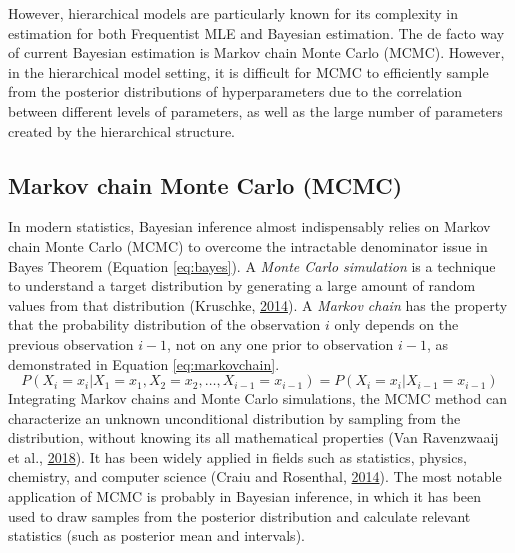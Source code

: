 \documentclass[12pt]{book}
\numberwithin{equation}{chapter}
\begin{document}
However, hierarchical models are particularly known for its complexity in estimation for both Frequentist MLE and Bayesian estimation. The de facto way of current Bayesian estimation is Markov chain Monte Carlo (MCMC). However, in the hierarchical model setting, it is difficult for MCMC to efficiently sample from the posterior distributions of hyperparameters due to the correlation between different levels of parameters, as well as the large number of parameters created by the hierarchical structure.

\hypertarget{markov-chain-monte-carlo-mcmc}{%
\subsection{Markov chain Monte Carlo (MCMC)}\label{markov-chain-monte-carlo-mcmc}}

In modern statistics, Bayesian inference almost indispensably relies on Markov chain Monte Carlo (MCMC) to overcome the intractable denominator issue in Bayes Theorem (Equation \eqref{eq:bayes}). A \emph{Monte Carlo simulation} is a technique to understand a target distribution by generating a large amount of random values from that distribution (Kruschke, \protect\hyperlink{ref-kruschke2014doing}{2014}). A \emph{Markov chain} has the property that the probability distribution of the observation \(i\) only depends on the previous observation \(i-1\), not on any one prior to observation \(i-1\), as demonstrated in Equation \eqref{eq:markovchain}.
\begin{equation}
P\left(X_{i}=x_{i} | X_{1}=x_{1}, X_{2}=x_{2}, \ldots, X_{i-1}=x_{i-1}\right) = P\left(X_{i}=x_{i} | X_{i-1}=x_{i-1}\right)
\label{eq:markovchain}
\end{equation}
Integrating Markov chains and Monte Carlo simulations, the MCMC method can characterize an unknown unconditional distribution by sampling from the distribution, without knowing its all mathematical properties (Van Ravenzwaaij et al., \protect\hyperlink{ref-van2018simple}{2018}). It has been widely applied in fields such as statistics, physics, chemistry, and computer science (Craiu and Rosenthal, \protect\hyperlink{ref-craiu2014bayesian}{2014}). The most notable application of MCMC is probably in Bayesian inference, in which it has been used to draw samples from the posterior distribution and calculate relevant statistics (such as posterior mean and intervals).
\end{document}
